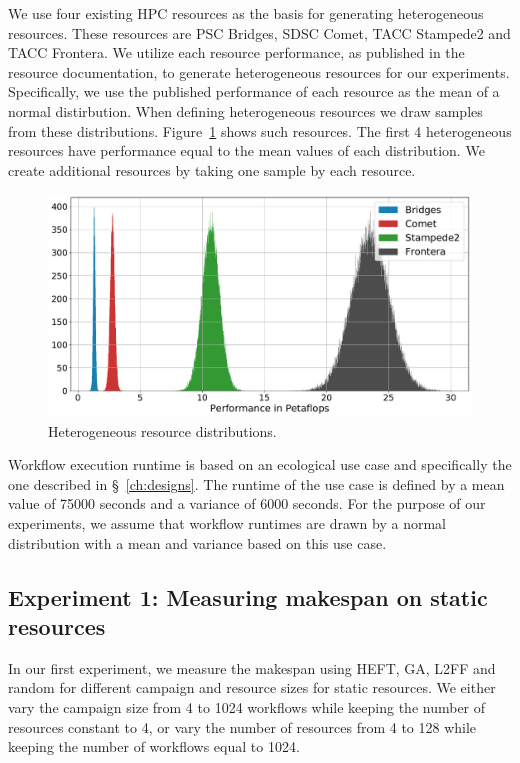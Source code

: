 We use four existing HPC resources as the basis for generating heterogeneous resources.
These resources are PSC Bridges, SDSC Comet, TACC Stampede2 and TACC Frontera.
We utilize each resource performance, as published in the resource documentation, to generate heterogeneous resources for our experiments.
Specifically, we use the published performance of each resource as the mean of a normal distirbution.
When defining heterogeneous resources we draw samples from these distributions.
Figure~\ref{fig:heter_res} shows such resources.
The first 4 heterogeneous resources have performance equal to the mean values of each distribution.
We create additional resources by taking one sample by each resource.

\begin{figure}[ht!]
    \centering
    \includegraphics[width=.95\textwidth]{figures/campaign/hetero_res.pdf}
    \caption{Heterogeneous resource distributions.}
    \label{fig:heter_res}
\end{figure}

Workflow execution runtime is based on an ecological use case and specifically the one described in \S~\ref{ch:designs}.
The runtime of the use case is defined by a mean value of 75000 seconds and a variance of 6000 seconds.
For the purpose of our experiments, we assume that workflow runtimes are drawn by a normal distribution with a mean and variance based on this use case.

\subsection{Experiment 1: Measuring makespan on static resources}

In our first experiment, we measure the makespan using HEFT, GA, L2FF and random for different campaign and resource sizes for static resources.
We either vary the campaign size from 4 to 1024 workflows while keeping the number of resources constant to 4, or vary the number of resources from 4 to 128 while keeping the number of workflows equal to 1024.

